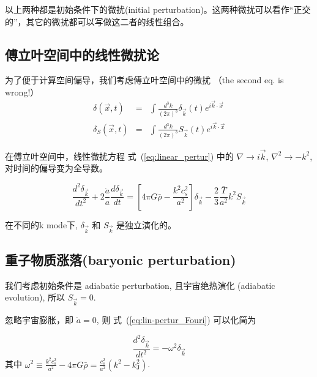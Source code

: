 \documentclass[12pt]{ctexart}
\newcommand{\refeq}[1]{式~(\ref{#1})}
\begin{document}
以上两种都是初始条件下的微扰(initial perturbation)。这两种微扰可以看作“正交的”，其它的微扰都可以写做这二者的线性组合。

\subsection{傅立叶空间中的线性微扰论}

为了便于计算空间偏导，我们考虑傅立叶空间中的微扰
（the second eq. is wrong!）
\begin{eqnarray}
    \delta\left(\vec{x},t\right) &=& \int \frac{d^3k}{(2\pi)^3} \delta_{\vec{k}}\left(t\right) e^{i\vec{k}\cdot \vec{x}} \\ 
    \delta_S\left(\vec{x},t\right) &=& \int \frac{d^3k}{(2\pi)^3} S_{\vec{k}}\left(t\right) e^{i\vec{k}\cdot \vec{x}}
\end{eqnarray}
\begin{equation}
\end{equation}

在傅立叶空间中，线性微扰方程 \refeq{eq:linear_pertur} 中的 $\nabla \rightarrow i\vec{k}$, $\nabla^2 \rightarrow -k^2$, 对时间的偏导变为全导数。
\begin{shaded}
\begin{equation} \label{eq:lin-pertur_Fouri}
    \frac{d^2 \delta_{\vec{k}}}{dt^2 } + 2\frac{\dot{a}}{a} \frac{d\delta_{\vec{k}}}{dt} = \left[4\pi G \bar{\rho}-\frac{k^2c_s^2}{a^2}\right] \delta_{\vec{k}} -\frac{2}{3}\frac{\bar{T}}{a^2}k^2 S_{\vec{k}}
\end{equation}
\end{shaded}
在不同的k mode下,  $\delta_{\vec{k}}$ 和 $S_{\vec{k}}$ 是独立演化的。

\subsection{重子物质涨落(baryonic perturbation)}
 
我们考虑初始条件是 adiabatic perturbation, 且宇宙绝热演化 (adiabatic evolution), 所以  $S_{\vec{k}}=0$.

忽略宇宙膨胀，即 $\dot{a}=0$, 则 \refeq{eq:lin-pertur_Fouri} 可以化简为

\begin{equation}
    \frac{d^2 \delta_{\vec{k}}}{dt^2} = -\omega^2 \delta_{\vec{k}}
\end{equation}
其中 $\omega^2 \equiv \frac{k^2 c_s^2}{a^2} - 4\pi G \bar{\rho} = \frac{c_s^2}{a^2}\left(k^2 - k_\text{J}^2\right)$. 
\end{document}
